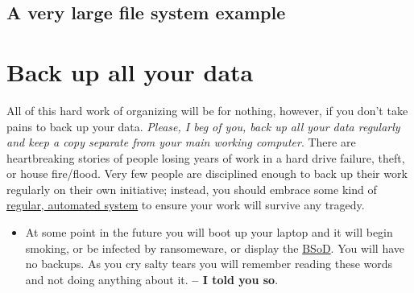 \subsection{A very large file system example}

{\large
{}  
}

\section{Back up all your data}

All of this hard work of organizing will be for nothing, however, if you don't take pains to back up your data. \emph{Please, I beg of you, back up all your data regularly and keep a copy separate from your main working computer}. There are heartbreaking stories of people losing years of work in a hard drive failure, theft, or house fire/flood. Very few people are disciplined enough to back up their work regularly on their own initiative; instead, you should embrace some kind of \href{https://www.jwz.org/blog/2007/09/psa-backups/}{regular, automated system} to ensure your work will survive any tragedy. 

\begin{itemize}
\item At some point in the future you will boot up your laptop and it will begin smoking, or be infected by ransomeware, or display the \href{https://en.wikipedia.org/wiki/Blue_Screen_of_Death}{BSoD}. You will have no backups. As you cry salty tears you will remember reading these words and not doing anything about it. \textbf{ -- I told you so}.
\end{itemize}
